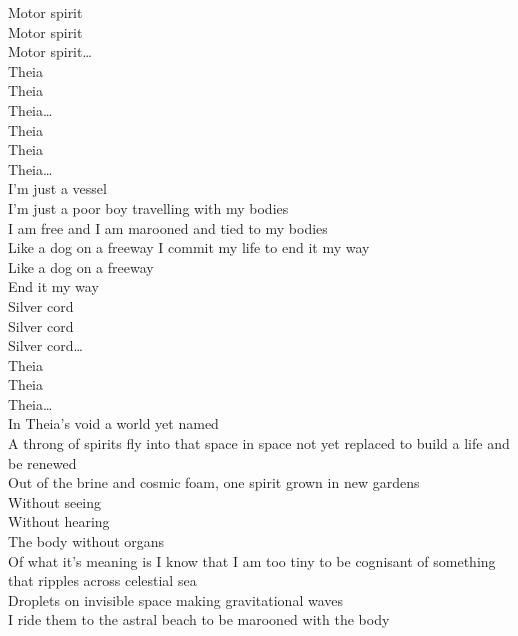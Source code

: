 
Motor spirit\\
Motor spirit\\
Motor spirit…\\

Theia\\
Theia\\
Theia…\\

Theia\\
Theia\\
Theia…\\

I'm just a vessel\\
I'm just a poor boy travelling with my bodies\\
I am free and I am marooned and tied to my bodies\\

Like a dog on a freeway I commit my life to end it my way\\
Like a dog on a freeway\\
End it my way\\

Silver cord\\
Silver cord\\
Silver cord…\\

Theia\\
Theia\\
Theia…\\

In Theia's void a world yet named\\
A throng of spirits fly into that space in space not yet replaced to build a life and be renewed\\
Out of the brine and cosmic foam, one spirit grown in new gardens\\
Without seeing\\
Without hearing\\
The body without organs\\

Of what it's meaning is I know that I am too tiny to be cognisant of something that ripples across celestial sea\\
Droplets on invisible space making gravitational waves\\
I ride them to the astral beach to be marooned with the body\\


